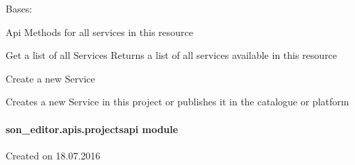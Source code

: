 \documentclass[letterpaper,10pt,english]{sphinxmanual}
\begin{document}

\begin{fulllineitems}
\label{_source/son_editor.apis:son_editor.apis.project_servicesapi.Services}
Bases: 

Api Methods for all services in this resource

\begin{fulllineitems}
\label{_source/son_editor.apis:son_editor.apis.project_servicesapi.Services.get}
Get a list of all Services
Returns a list of all services available in this resource

\end{fulllineitems}


\begin{fulllineitems}
\label{_source/son_editor.apis:son_editor.apis.project_servicesapi.Services.methods}
\end{fulllineitems}


\begin{fulllineitems}
\label{_source/son_editor.apis:son_editor.apis.project_servicesapi.Services.post}
Create a new Service

Creates a new Service in this project or
publishes it in the catalogue or platform

\end{fulllineitems}


\end{fulllineitems}



\paragraph{son\_editor.apis.projectsapi module}
\label{_source/son_editor.apis:son-editor-apis-projectsapi-module}\label{_source/son_editor.apis:module-son_editor.apis.projectsapi}
Created on 18.07.2016
\end{document}
